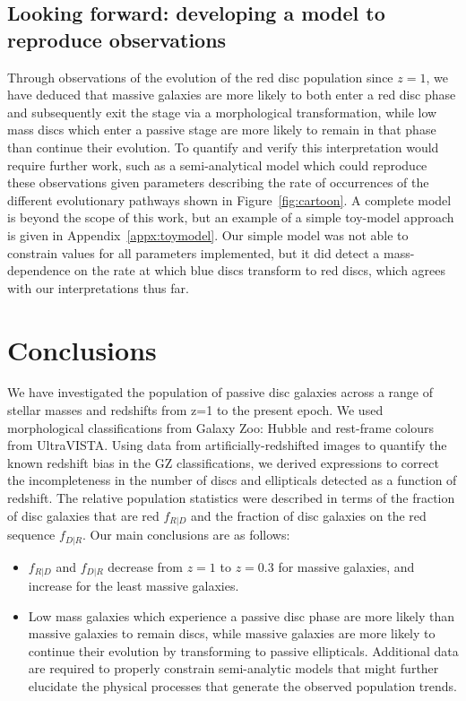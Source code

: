 \documentclass[useAMS,usenatbib]{mn2e}
\begin{document}
\subsection{Looking forward: developing a model to reproduce observations}

Through observations of the evolution of the red disc population since $z=1$, we have deduced that massive galaxies are more likely to both enter a red disc phase and subsequently exit the stage via a morphological transformation, while low mass discs which enter a passive stage are more likely to remain in that phase than continue their evolution. To quantify and verify this interpretation would require further work, such as a semi-analytical model which could reproduce these observations given parameters describing the rate of occurrences of the different evolutionary pathways shown in Figure~\ref{fig:cartoon}. A complete model is beyond the scope of this work, but an example of a simple toy-model approach is given in Appendix~\ref{appx:toymodel}. Our simple model was not able to constrain values for all parameters implemented, but it did detect a mass-dependence on the rate at which blue discs transform to red discs, which agrees with our interpretations thus far. 


\section{Conclusions}
\label{sec:conclusions}

We have investigated the population of passive disc galaxies across a range of stellar masses and redshifts from z=1 to the present epoch. We used morphological classifications from Galaxy Zoo: Hubble and rest-frame colours from UltraVISTA. Using data from artificially-redshifted  images to quantify the known redshift bias in the GZ classifications, we derived expressions to correct the incompleteness in the number of discs and ellipticals detected as a function of redshift. The relative population statistics were described in terms of the fraction of disc galaxies that are red $f_{R|D}$ and the fraction of disc galaxies on the red sequence $f_{D|R}$. Our main conclusions are as follows:

\begin{itemize}

\item{$f_{R|D}$ and $f_{D|R}$ decrease from $z=1$ to $z=0.3$ for massive galaxies, and increase for the least massive galaxies.}

\item{Low mass galaxies which experience a passive disc phase are more likely than massive galaxies to remain discs, while massive galaxies are more likely to continue their evolution by transforming to passive ellipticals. Additional data are required to properly constrain semi-analytic models that might further elucidate the physical processes that generate the observed population trends.}


\end{itemize}
\end{document}
